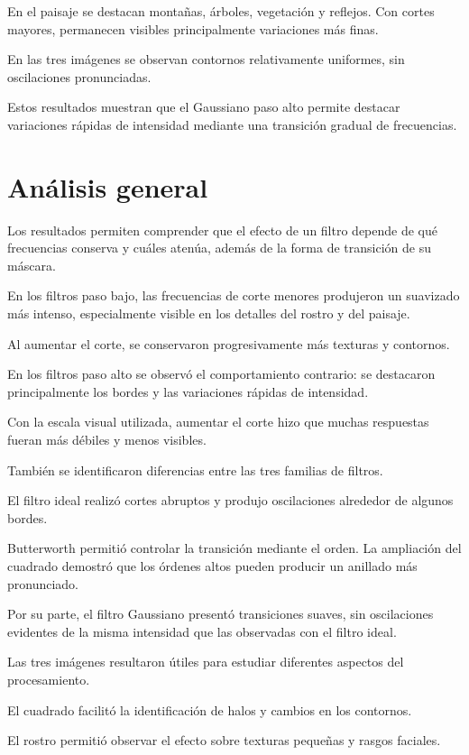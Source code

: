 \documentclass[11pt,letterpaper]{article}
\begin{document}
En el paisaje se destacan montañas,
árboles, vegetación y reflejos.
Con cortes mayores, permanecen visibles
principalmente variaciones más finas.

En las tres imágenes se observan
contornos relativamente uniformes,
sin oscilaciones pronunciadas.

Estos resultados muestran que el Gaussiano
paso alto permite destacar variaciones
rápidas de intensidad mediante
una transición gradual de frecuencias.

\section{Análisis general}

Los resultados permiten comprender
que el efecto de un filtro depende
de qué frecuencias conserva y cuáles
atenúa, además de la forma de transición
de su máscara.

En los filtros paso bajo, las frecuencias
de corte menores produjeron un suavizado
más intenso, especialmente visible
en los detalles del rostro y del paisaje.

Al aumentar el corte, se conservaron
progresivamente más texturas y contornos.

En los filtros paso alto se observó
el comportamiento contrario:
se destacaron principalmente los bordes
y las variaciones rápidas de intensidad.

Con la escala visual utilizada, aumentar
el corte hizo que muchas respuestas
fueran más débiles y menos visibles.

También se identificaron diferencias
entre las tres familias de filtros.

El filtro ideal realizó cortes abruptos
y produjo oscilaciones alrededor de
algunos bordes.

Butterworth permitió controlar
la transición mediante el orden.
La ampliación del cuadrado demostró
que los órdenes altos pueden producir
un anillado más pronunciado.

Por su parte, el filtro Gaussiano
presentó transiciones suaves,
sin oscilaciones evidentes de la
misma intensidad que las observadas
con el filtro ideal.

Las tres imágenes resultaron útiles
para estudiar diferentes aspectos
del procesamiento.

El cuadrado facilitó la identificación
de halos y cambios en los contornos.

El rostro permitió observar el efecto
sobre texturas pequeñas y rasgos faciales.
\end{document}
